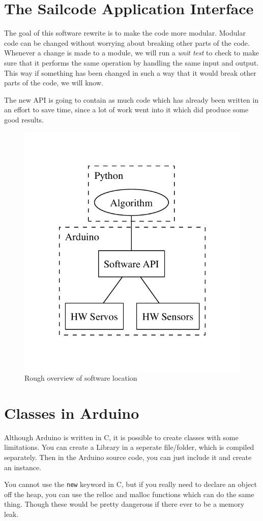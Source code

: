 \documentclass[letterpaper]{article}
\begin{document}
\section{The Sailcode Application Interface} %
\label{sec:The Sailcode Application Interface}

The goal of this software rewrite is to make the code more modular. Modular code can be changed without worrying about breaking other parts of the code. Whenever a change is made to a module, we will run a \emph{unit test} to check to make sure that it performs the same operation by handling the same input and output. This way if something has been changed in such a way that it would break other parts of the code, we will know.

The new API is going to contain as much code which has already been written in an effort to save time, since a lot of work went into it which did produce some good results.

\begin{figure}[h]
	\centering
	\includegraphics[width=0.4\linewidth]{mindmap_test/overview.pdf}
	\caption{Rough overview of software location}
	\label{fig:overview}
\end{figure}


\section{Classes in Arduino} %
\label{sec:Classes in Arduino}

Although Arduino is written in C, it is possible to create classes with some limitations. You can create a Library in a seperate file/folder, which is compiled separately. Then in the Arduino source code, you can just include it and create an instance.

You cannot use the \verb:new: keyword in C, but if you really need to declare an object off the heap, you can use the relloc and malloc functions which can do the same thing. Though these would be pretty dangerous if there ever to be a memory leak.
\end{document}
